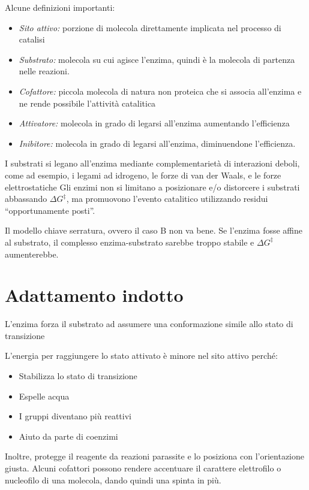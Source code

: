 Alcune definizioni importanti:
\begin{itemize}
\item \emph{Sito attivo:} porzione di molecola direttamente implicata nel processo di catalisi
\item \emph{Substrato:} molecola su cui agisce l'enzima, quindi è la molecola di partenza nelle reazioni.
\item \emph{Cofattore:} piccola molecola di natura non proteica che si associa all'enzima e ne rende possibile l'attività catalitica
\item \emph{Attivatore:} molecola in grado di legarsi all'enzima aumentando l'efficienza
\item \emph{Inibitore:} molecola in grado di legarsi all'enzima, diminuendone l'efficienza.
\end{itemize}

I substrati si legano all'enzima mediante complementarietà di interazioni deboli, come ad esempio, i legami ad idrogeno, le forze di van der Waals, e le forze elettrostatiche
Gli enzimi non si limitano a posizionare e/o distorcere i substrati abbassando $\Delta G^{\ddagger}$, ma promuovono l'evento catalitico utilizzando residui ``opportunamente posti''.


Il modello chiave serratura, ovvero il caso B non va bene. Se l'enzima fosse affine al substrato, il complesso enzima-substrato sarebbe troppo stabile e $\Delta G^{\ddagger}$ aumenterebbe.

\clearpage

\section{Adattamento indotto}

L'enzima forza il substrato ad assumere una conformazione simile allo stato di transizione


L'energia per raggiungere lo stato attivato è minore nel sito attivo perché:
\begin{itemize}
\item Stabilizza lo stato di transizione
\item Espelle acqua
\item I gruppi diventano più reattivi
\item Aiuto da parte di coenzimi
\end{itemize}
Inoltre, protegge il reagente da reazioni parassite e lo posiziona con l'orientazione giusta. Alcuni cofattori possono rendere accentuare il carattere elettrofilo o nucleofilo di una molecola, dando quindi una spinta in più.


